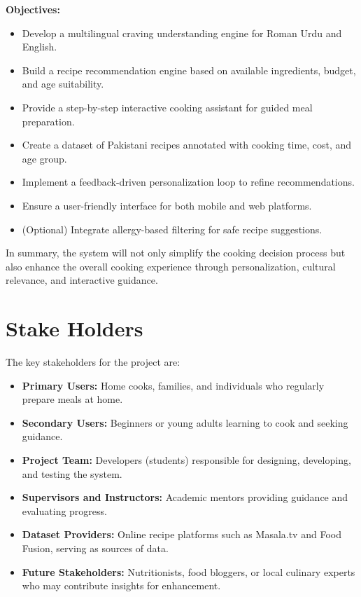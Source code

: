 \textbf{Objectives:}  
\begin{itemize}
    \item Develop a multilingual craving understanding engine for Roman Urdu and English.
    \item Build a recipe recommendation engine based on available ingredients, budget, and age suitability.
    \item Provide a step-by-step interactive cooking assistant for guided meal preparation.
    \item Create a dataset of Pakistani recipes annotated with cooking time, cost, and age group.
    \item Implement a feedback-driven personalization loop to refine recommendations.
    \item Ensure a user-friendly interface for both mobile and web platforms.
    \item (Optional) Integrate allergy-based filtering for safe recipe suggestions.
\end{itemize}

In summary, the system will not only simplify the cooking decision process but also enhance the overall cooking experience through personalization, cultural relevance, and interactive guidance.

\section{Stake Holders}

The key stakeholders for the project are:  
\begin{itemize}
    \item \textbf{Primary Users:} Home cooks, families, and individuals who regularly prepare meals at home.  
    \item \textbf{Secondary Users:} Beginners or young adults learning to cook and seeking guidance.  
    \item \textbf{Project Team:} Developers (students) responsible for designing, developing, and testing the system.  
    \item \textbf{Supervisors and Instructors:} Academic mentors providing guidance and evaluating progress.  
    \item \textbf{Dataset Providers:} Online recipe platforms such as Masala.tv and Food Fusion, serving as sources of data.  
    \item \textbf{Future Stakeholders:} Nutritionists, food bloggers, or local culinary experts who may contribute insights for enhancement.  
\end{itemize}

